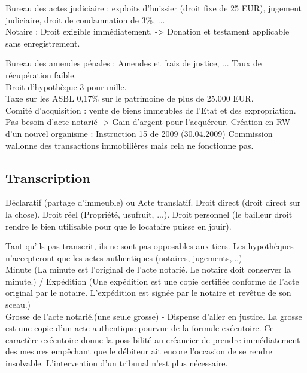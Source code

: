 \documentclass{book}
\begin{document}
Bureau des actes judiciaire : exploits d'huissier (droit fixe de 25 EUR), jugement judiciaire, droit de condamnation de 3\%, ...\\

Notaire : Droit exigible immédiatement. -> Donation et testament applicable sans enregistrement.

Bureau des amendes pénales : Amendes et frais de justice, ... Taux de récupération faible.\\

Droit d'hypothèque 3 pour mille.\\

Taxe sur les ASBL 0,17\% sur le patrimoine de plus de 25.000 EUR.\\ 

Comité d'acquisition : vente de biens immeubles de l'Etat et des expropriation. Pas besoin d'acte notarié -> Gain d'argent pour l'acquéreur. Création en RW d'un nouvel organisme : Instruction 15 de 2009 (30.04.2009) Commission wallonne des transactions immobilières mais cela ne fonctionne pas.

\subsection{Transcription}

Déclaratif (partage d'immeuble) ou Acte translatif. 
Droit direct (droit direct sur la chose). Droit réel (Propriété, usufruit, ...). Droit personnel (le bailleur droit rendre le bien utilisable pour que le locataire puisse en jouir).

Tant qu'ils pas transcrit, ils ne sont pas opposables aux tiers. Les hypothèques n'accepteront que les actes authentiques (notaires, jugements,...)\\

Minute (La minute est l'original de l'acte notarié. Le notaire doit conserver la minute.) / Expédition (Une expédition est une copie certifiée conforme de l'acte original par le notaire. L'expédition est signée par le notaire et revêtue de son sceau.)\\

Grosse de l'acte notarié.(une seule grosse) - Dispense d'aller en justice. La grosse est une copie d'un acte authentique pourvue de la formule exécutoire. Ce caractère exécutoire donne la possibilité au créancier de prendre immédiatement des mesures empêchant que le débiteur ait encore l'occasion de se rendre insolvable. L'intervention d'un tribunal n'est plus nécessaire.\\
\end{document}

